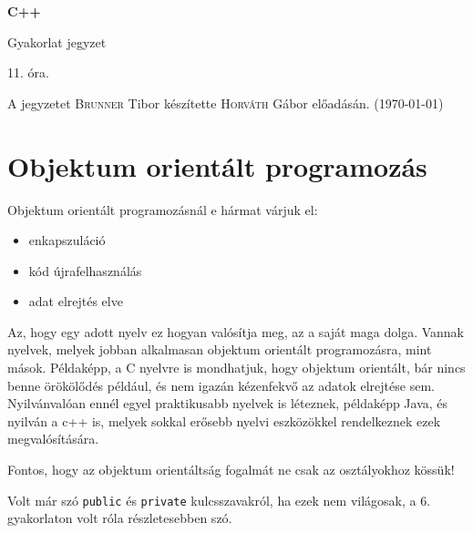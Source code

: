 \documentclass[a4paper,11.5pt]{article}
\begin{document}
	\setlength\parindent{0pt}
	\def\s{\hspace{0.2mm}\vphantom{\beta}}
	\def\Z{\mathbb{Z}}
	\def\Q{\mathbb{Q}}
	\def\R{\mathbb{R}}
	\def\C{\mathbb{C}}
	\def\N{\mathbb{N}}
	\def\Ra{\overline{\mathbb{R}}}
	
	\def\sume{\displaystyle\sum_{n=1}^{+\infty}}
	\def\sumn{\displaystyle\sum_{n=0}^{+\infty}}
	
	\def\narrow{\underset{n\rightarrow+\infty}{\longrightarrow}}
	\def\limn{\displaystyle\lim_{n\to +\infty}}
	\def\limx{\displaystyle\lim_{x\to +\infty}}
	
	\theoremstyle{definition}
	\newtheorem{theorem}{Tétel}[subsection] 
	
	\theoremstyle{definition}
	\newtheorem{definition}[theorem]{Definíció} 
	\newtheorem{example}[theorem]{Példa} 
	\newtheorem{task}[theorem]{Feladat} 
	\newtheorem{note}[theorem]{Megjegyzés}
	\begin{center}
		{\LARGE\textbf{C++}}
		
		{\Large Gyakorlat jegyzet}
		
		11. óra.
	\end{center}
	A jegyzetet \textsc{Brunner} Tibor készítette \textsc{Horváth} Gábor  előadásán. (\today)
	\section{Objektum orientált programozás}
	Objektum orientált programozásnál e hármat várjuk el:
	\begin{itemize}
		\item enkapszuláció
		\item kód újrafelhasználás
		\item adat elrejtés elve
	\end{itemize}
	Az, hogy egy adott nyelv ez hogyan valósítja meg, az a saját maga dolga. Vannak nyelvek, melyek jobban alkalmasan objektum orientált programozásra, mint mások. Példaképp, a C nyelvre is mondhatjuk, hogy objektum orientált, bár nincs benne örökölődés például, és nem igazán kézenfekvő az adatok elrejtése sem. Nyilvánvalóan ennél egyel praktikusabb nyelvek is léteznek, példaképp Java, és nyilván a c++ is, melyek sokkal erősebb nyelvi eszközökkel rendelkeznek ezek megvalósítására.
	
	Fontos, hogy az objektum orientáltság fogalmát ne csak az osztályokhoz kössük!
	
	Volt már szó \texttt{public} és \texttt{private} kulcsszavakról, ha ezek nem világosak, a 6. gyakorlaton volt róla részletesebben szó.
	
\end{document}
